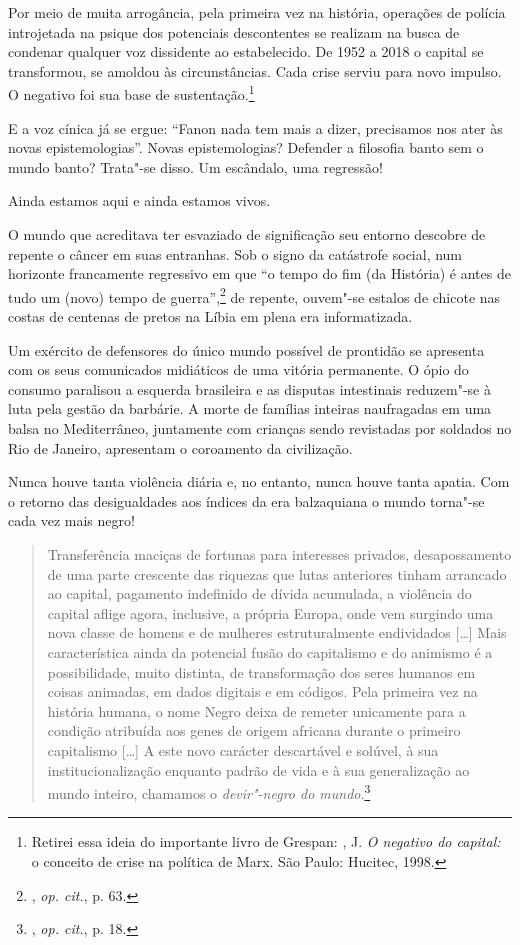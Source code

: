 Por meio de muita arrogância, pela primeira vez na história, operações
de polícia introjetada na psique dos potenciais descontentes se realizam
na busca de condenar qualquer voz dissidente ao estabelecido. De 1952 a
2018 o capital se transformou, se amoldou às circunstâncias. Cada crise
serviu para novo impulso. O negativo foi sua base de
sustentação.\footnote{Retirei essa ideia do importante livro de Grespan:
  , J. \emph{O negativo do capital:} o conceito de crise na
  política de Marx. São Paulo: Hucitec, 1998.}

E a voz cínica já se ergue: ``Fanon nada tem mais a dizer, precisamos
nos ater às novas epistemologias''. Novas epistemologias? Defender a
filosofia banto sem o mundo banto? Trata"-se disso. Um escândalo, uma
regressão!

Ainda estamos aqui e ainda estamos vivos.

O mundo que acreditava ter esvaziado de significação seu entorno
descobre de repente o câncer em suas entranhas. Sob o signo da
catástrofe social, num horizonte francamente regressivo em que ``o tempo
do fim (da História) é antes de tudo um (novo) tempo de
guerra'',\footnote{, \emph{op. cit.}, p. 63.} de repente, ouvem"-se
estalos de chicote nas costas de centenas de pretos na Líbia em plena
era informatizada.

Um exército de defensores do único mundo possível de prontidão se
apresenta com os seus comunicados midiáticos de uma vitória permanente.
O ópio do consumo paralisou a esquerda brasileira e as disputas
intestinais reduzem"-se à luta pela gestão da barbárie. A morte de
famílias inteiras naufragadas em uma balsa no Mediterrâneo, juntamente
com crianças sendo revistadas por soldados no Rio de Janeiro, apresentam
o coroamento da civilização.

Nunca houve tanta violência diária e, no entanto, nunca houve tanta
apatia. Com o retorno das desigualdades aos índices da era balzaquiana o
mundo torna"-se cada vez mais negro!

\begin{quote}
Transferência maciças de fortunas
para interesses privados, desapossamento de uma parte crescente das
riquezas que lutas anteriores tinham arrancado ao capital, pagamento
indefinido de dívida acumulada, a violência do capital aflige agora,
inclusive, a própria Europa, onde vem surgindo uma nova classe de homens
e de mulheres estruturalmente endividados {[}\ldots{}{]} Mais característica
ainda da potencial fusão do capitalismo e do animismo é a possibilidade,
muito distinta, de transformação dos seres humanos em coisas animadas,
em dados digitais e em códigos. Pela primeira vez na história humana, o
nome Negro deixa de remeter unicamente para a condição atribuída aos
genes de origem africana durante o primeiro capitalismo {[}\ldots{}{]} A este
novo carácter descartável e solúvel, à sua institucionalização enquanto
padrão de vida e à sua generalização ao mundo inteiro, chamamos o
\emph{devir"-negro do mundo}.\footnote{, \emph{op. cit.}, p. 18.}
\end{quote}

